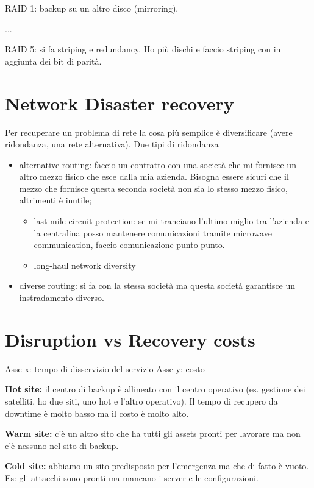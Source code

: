 RAID 1: backup su un altro disco (mirroring).

...

RAID 5: si fa striping e redundancy. Ho più dischi e faccio striping con in 
aggiunta dei bit di parità.

\section{Network Disaster recovery}

Per recuperare un problema di rete la cosa più semplice è diversificare (avere 
ridondanza, una rete alternativa). Due tipi di ridondanza
\begin{itemize}
\item alternative routing: faccio un contratto con una società che mi fornisce 
un altro mezzo fisico che esce dalla mia azienda. Bisogna essere sicuri che il 
mezzo che fornisce questa seconda società non sia lo stesso mezzo fisico, 
altrimenti è inutile;
\begin{itemize}
\item last-mile circuit protection: se mi tranciano l'ultimo miglio tra 
l'azienda e la centralina posso mantenere comunicazioni tramite microwave 
communication, faccio comunicazione punto punto.
\item long-haul network diversity
\end{itemize}
\item diverse routing: si fa con la stessa società ma questa società garantisce 
un instradamento diverso.
\end{itemize}

\section{Disruption vs Recovery costs}


Asse x: tempo di disservizio del servizio
Asse y: costo

\textbf{Hot site:} il centro di backup è allineato con il centro operativo (es. 
gestione dei satelliti, ho due siti, uno hot e l'altro operativo). Il tempo di 
recupero da downtime è molto basso ma il costo è molto alto.

\textbf{Warm site:} c'è un altro sito che ha tutti gli assets pronti per 
lavorare ma non c'è nessuno nel sito di backup.

\textbf{Cold site:} abbiamo un sito predisposto per l'emergenza ma che di fatto 
è vuoto. Es: gli attacchi sono pronti ma mancano i server e le configurazioni.

